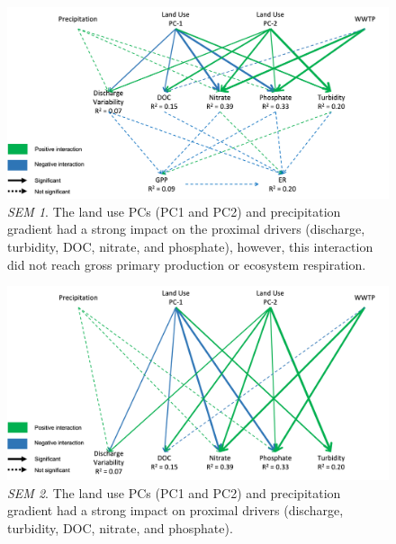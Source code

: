 \begin{landscape}
\begin{figure}[htb]
\begin{center}
\includegraphics[scale=0.8]{Figs/SEMmetab.png}
\caption[SEM 1]{\textit{SEM 1}. The land use PCs (PC1 and PC2) and precipitation gradient had a strong impact on the proximal drivers (discharge, turbidity, DOC, nitrate, and phosphate), however, this interaction did not reach gross primary production or ecosystem respiration.}
\label{Fig:SEMmetab}
\end{center}
\end{figure}
\end{landscape}

\begin{landscape}
\begin{figure}[htb]
\begin{center}
\includegraphics[scale=0.8]{Figs/SEMdrivers.png}
\caption[SEM 2]{\textit{SEM 2}. The land use PCs (PC1 and PC2) and precipitation gradient had a strong impact on proximal drivers (discharge, turbidity, DOC, nitrate, and phosphate).}
\label{Fig:SEMdrivers}
\end{center}
\end{figure}
\end{landscape}

\endinput

